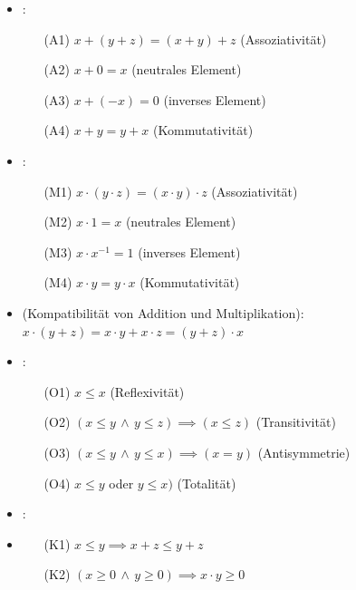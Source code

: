 \begin{itemize}
    \item {}:
    \begin{itemize}
        \item[(A1)] $x + (y + z) = (x + y) + z$ (Assoziativität)
        \item[(A2)] $x + 0 = x$ (neutrales Element)
        \item[(A3)] $x + (-x) = 0$ (inverses Element)
        \item[(A4)] $x + y = y + x$ (Kommutativität) 
    \end{itemize}

    \item {}:
    \begin{itemize}
        \item[(M1)] $x \cdot (y \cdot z) = (x \cdot y) \cdot z$ (Assoziativität)
        \item[(M2)] $x \cdot 1 = x$ (neutrales Element)
        \item[(M3)] $x \cdot x^{-1} = 1$ (inverses Element)
        \item[(M4)] $x \cdot y = y \cdot x$ (Kommutativität)
    \end{itemize}
    
    \item {} (Kompatibilität von Addition und Multiplikation):
        $x \cdot (y + z) = x \cdot y + x \cdot z = (y + z) \cdot x$
    
    \item {}:
    \begin{itemize}
        \item[(O1)] $x\le x$ (Reflexivität)
        \item[(O2)] $(x\le y \, \land \, y\le z) \implies (x\le z)$ (Transitivität)
        \item[(O3)] $(x\le y \, \land \, y\le x) \implies (x = y)$ (Antisymmetrie)
        \item[(O4)] $x\le y$ oder $y\le x)$ (Totalität)
    \end{itemize}

    \item {}:
    \item \begin{itemize}
        \item[(K1)] $x\le y \implies x + z\le y + z$
        \item[(K2)] $(x\ge 0 \, \land \, y\ge 0) \implies x \cdot y\ge 0$
    \end{itemize}
\end{itemize}

